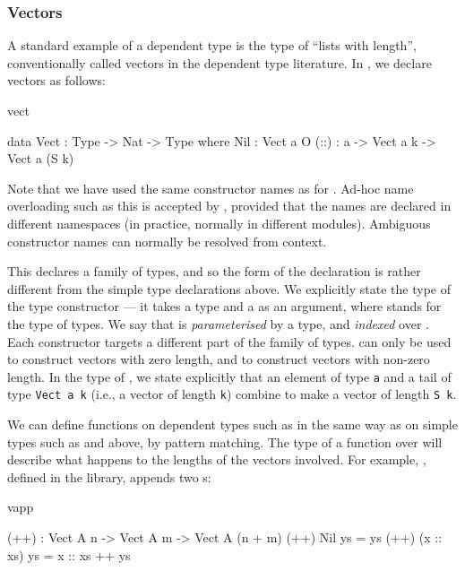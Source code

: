 \subsubsection{Vectors}

A standard example of a dependent type is the type of ``lists with length'',
conventionally called vectors in the dependent type literature. In \Idris{},
we declare vectors as follows:

\begin{SaveVerbatim}{vect}

data Vect : Type -> Nat -> Type where
   Nil  : Vect a O
   (::) : a -> Vect a k -> Vect a (S k)

\end{SaveVerbatim}

\noindent
Note that we have used the same constructor names as for . Ad-hoc
name overloading such as this is accepted by \Idris{}, provided that the names
are declared in different namespaces (in practice, normally in different modules).
Ambiguous constructor names can normally be resolved from context.

This declares a family of types, and so the form of the declaration is rather
different from the simple type declarations above. We explicitly state the type
of the type constructor  --- it takes a type and a  as an
argument, where  stands for the type of types. We say that 
is \emph{parameterised} by a type, and \emph{indexed} over . Each
constructor targets a different part of the family of types.  can only
be used to construct vectors with zero length, and \tDC{::} to construct
vectors with non-zero length. In the type of \tDC{::}, we state explicitly that an element
of type \texttt{a} and a tail of type \texttt{Vect a k} (i.e., a vector of length \texttt{k})
combine to make a vector of length \texttt{S k}.

We can define functions on dependent types such as  in the same way
as on simple types such as  and  above, by pattern matching.
The type of a function over  will describe what happens to the
lengths of the vectors involved. For example, \tFN{++}, defined in the
library, appends two s:

\begin{SaveVerbatim}{vapp}

(++) : Vect A n -> Vect A m -> Vect A (n + m)
(++) Nil       ys = ys
(++) (x :: xs) ys = x :: xs ++ ys

\end{SaveVerbatim}

